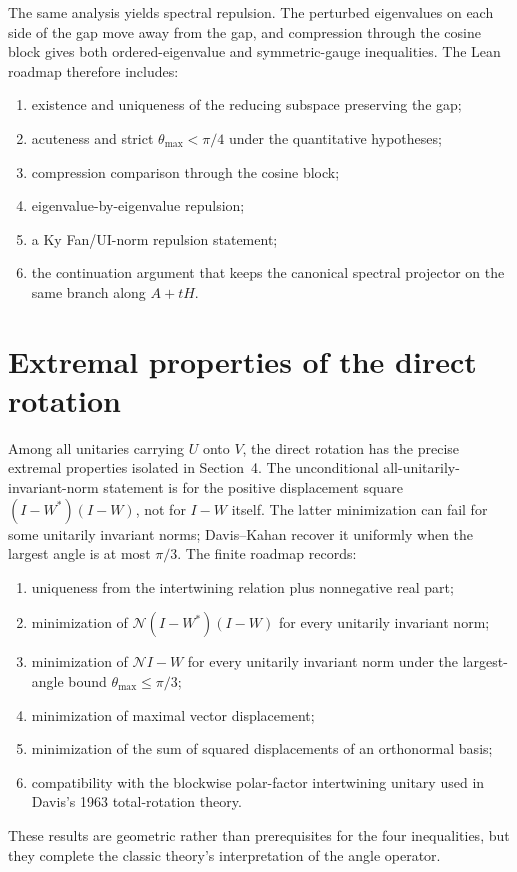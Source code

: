 \documentclass[11pt]{article}
\newcommand{\Nn}{\mathcal N}
\theoremstyle{remark}
\begin{document}
The same analysis yields spectral repulsion.  The perturbed eigenvalues on each
side of the gap move away from the gap, and compression through the cosine
block gives both ordered-eigenvalue and symmetric-gauge inequalities.  The Lean
roadmap therefore includes:
\begin{enumerate}
\item existence and uniqueness of the reducing subspace preserving the gap;
\item acuteness and strict \(\theta_{\max}<\pi/4\) under the quantitative
hypotheses;
\item compression comparison through the cosine block;
\item eigenvalue-by-eigenvalue repulsion;
\item a Ky Fan/UI-norm repulsion statement;
\item the continuation argument that keeps the canonical spectral projector on
the same branch along \(A+tH\).
\end{enumerate}

\section{Extremal properties of the direct rotation}

Among all unitaries carrying \(U\) onto \(V\), the direct rotation has the
precise extremal properties isolated in Section~4.  The unconditional
all-unitarily-invariant-norm statement is for the positive displacement
square \((I-W^*)(I-W)\), not for \(I-W\) itself.  The latter minimization can
fail for some unitarily invariant norms; Davis--Kahan recover it uniformly
when the largest angle is at most \(\pi/3\).  The finite roadmap records:
\begin{enumerate}
\item uniqueness from the intertwining relation plus nonnegative real part;
\item minimization of \(\Nn{(I-W^*)(I-W)}\) for every unitarily invariant norm;
\item minimization of \(\Nn{I-W}\) for every unitarily invariant norm under
      the largest-angle bound \(\theta_{\max}\le\pi/3\);
\item minimization of maximal vector displacement;
\item minimization of the sum of squared displacements of an orthonormal basis;
\item compatibility with the blockwise polar-factor intertwining unitary used
in Davis's 1963 total-rotation theory.
\end{enumerate}
These results are geometric rather than prerequisites for the four inequalities,
but they complete the classic theory's interpretation of the angle operator.
\end{document}
